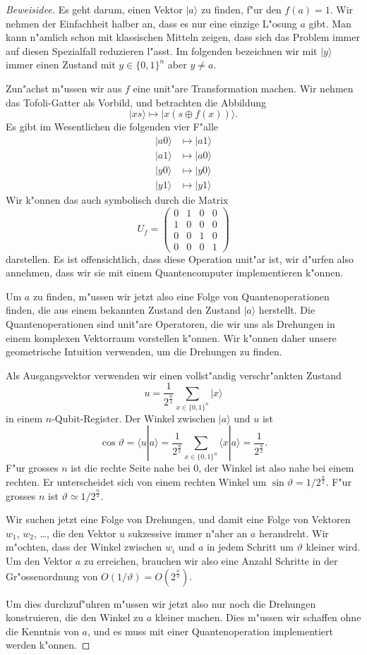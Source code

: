 \begin{proof}[Beweisidee]
Es geht darum, einen Vektor $|a\rangle$ zu finden, f"ur den $f(a)=1$.
Wir nehmen der Einfachheit halber an, dass es nur eine einzige L"osung $a$
gibt.
Man kann n"amlich schon mit klassischen Mitteln zeigen, dass sich das
Problem immer auf diesen Spezialfall reduzieren l"asst.
Im folgenden bezeichnen wir mit $|y\rangle$ immer einen Zustand mit
$y\in\{0,1\}^n$ aber $y\ne a$.

Zun"achst m"ussen wir aus $f$ eine unit"are Transformation machen.
Wir nehmen das Tofoli-Gatter als Vorbild, und betrachten die Abbildung
\[
|x s\rangle \mapsto |x (s\oplus f(x))\rangle.
\]
Es gibt im Wesentlichen die folgenden vier F"alle
\begin{align*}
|a0\rangle&\mapsto |a1\rangle\\
|a1\rangle&\mapsto |a0\rangle\\
|y0\rangle&\mapsto |y0\rangle\\
|y1\rangle&\mapsto |y1\rangle
\end{align*}
Wir k"onnen das auch symbolisch durch die Matrix
\[
U_f
=
\begin{pmatrix}
0&1&0&0\\
1&0&0&0\\
0&0&1&0\\
0&0&0&1
\end{pmatrix}
\]
darstellen. Es ist offensichtlich, dass diese Operation unit"ar ist, 
wir d"urfen also annehmen, dass wir sie mit einem Quantencomputer
implementieren k"onnen.

Um $a$ zu finden, m"ussen wir jetzt also eine Folge von Quantenoperationen
finden, die aus einem bekannten Zustand den Zustand $|a\rangle$ herstellt.
Die Quantenoperationen sind unit"are Operatoren, die wir uns als Drehungen
in einem komplexen Vektorraum vorstellen k"onnen.
Wir k"onnen daher unsere geometrische Intuition verwenden, um die Drehungen
zu finden.

Als Ausgangsvektor verwenden wir einen vollst"andig verschr"ankten Zustand
\[
u=\frac1{2^{\frac{n}2}}\sum_{x\in\{0,1\}^n}|x\rangle
\]
in einem $n$-Qubit-Register.
Der Winkel zwischen $|a\rangle$ und $u$ ist
\[
\cos\vartheta
=
\langle u|a\rangle
=
\frac1{2^{\frac{n}2}}
\sum_{x\in\{0,1\}^n}\langle x|a\rangle
=
\frac1{2^{\frac{n}2}}.
\]
F"ur grosses $n$ ist die rechte Seite nahe bei $0$, der Winkel ist
also nahe bei einem rechten.
Er unterscheidet sich von einem rechten Winkel um
$\sin\vartheta=1/2^{\frac{n}2}$.
F"ur grosses $n$ ist $\vartheta\simeq 1/2^{\frac{n}2}$.

Wir suchen jetzt eine Folge von Drehungen, und damit
eine Folge von Vektoren $w_1$, $w_2$, \dots, die den Vektor $u$ sukzessive
immer n"aher an $a$ herandreht.
Wir m"ochten, dass der Winkel zwischen $w_i$ und $a$ in jedem Schritt 
um $\vartheta$ kleiner wird.
Um den Vektor $a$ zu erreichen, brauchen wir also eine Anzahl Schritte
in der Gr"ossenordnung von $O(1/\vartheta)=O(2^{\frac{n}2})$.

Um dies durchzuf"uhren m"ussen wir jetzt also nur noch die Drehungen
konstruieren, die den Winkel zu $a$ kleiner machen.
Dies m"ussen wir schaffen ohne die Kenntnis von $a$, und es muss mit
einer Quantenoperation implementiert werden k"onnen.
\end{proof}

